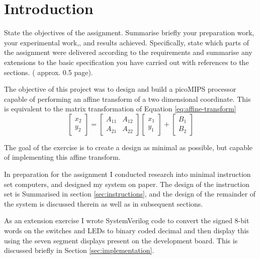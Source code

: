 \section{Introduction}

\review
{
	State the objectives of the assignment. Summarise briefly your preparation work,  your experimental work,, and results achieved. Specifically, state which parts of the assignment were delivered according to the requirements and summarise any extensions to the basic specification you have carried out with references to the sections.  ( approx. 0.5 page).
}

The objective of this project was to design and build a picoMIPS processor capable of performing an affine transform of a two dimensional coordinate. This is equivalent to the matrix transformation of Equation \ref{eq:affine-transform}
\begin{equation}
\begin{bmatrix}
x_2\\
y_2
\end{bmatrix}
=
\begin{bmatrix}
A_{11} & A_{12}\\
A_{21} & A_{22}
\end{bmatrix}
\begin{bmatrix}
x_1\\
y_1
\end{bmatrix}
+
\begin{bmatrix}
B_1\\
B_2
\end{bmatrix}
\label{eq:affine-transform}
\end{equation}

The goal of the exercise is to create a design as minimal as possible, but capable of implementing this affine transform.

In preparation for the assignment I conducted research into minimal instruction set computers, and designed my system on paper. The design of the instruction set is Summarised in section \ref{sec:instructions}, and the design of the remainder of the system is discussed therein as well as in subsequent sections.

As an extension exercise I wrote SystemVerilog code to convert the signed 8-bit words on the switches and LEDs to binary coded decimal and then display this using the seven segment displays present on the development board. This is discussed briefly in Section \ref{sec:implementation}.


